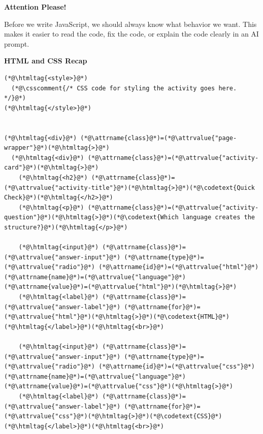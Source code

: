 \documentclass{article}
\begin{document}
\begin{attentionbox}
  \textbf{\Bitter\textcolor{naranja}{Attention Please!}}

  Before we write JavaScript, we should always know what behavior we want.
  This makes it easier to read the code, fix the code, or explain the code clearly in an AI prompt.
\end{attentionbox}


\vspace{0.3cm}

\vspace{0.3cm}

\noindent
\begin{minipage}[t]{0.48\textwidth}
  \textbf{\Bitter\textcolor{naranja}{HTML and CSS Recap}}

  \vspace{0.15cm}

  \begin{lstlisting}
(*@\htmltag{<style>}@*)
  (*@\csscomment{/* CSS code for styling the activity goes here. */}@*)
(*@\htmltag{</style>}@*)


(*@\htmltag{<div}@*) (*@\attrname{class}@*)=(*@\attrvalue{"page-wrapper"}@*)(*@\htmltag{>}@*)
  (*@\htmltag{<div}@*) (*@\attrname{class}@*)=(*@\attrvalue{"activity-card"}@*)(*@\htmltag{>}@*)
    (*@\htmltag{<h2}@*) (*@\attrname{class}@*)=(*@\attrvalue{"activity-title"}@*)(*@\htmltag{>}@*)(*@\codetext{Quick Check}@*)(*@\htmltag{</h2>}@*)
    (*@\htmltag{<p}@*) (*@\attrname{class}@*)=(*@\attrvalue{"activity-question"}@*)(*@\htmltag{>}@*)(*@\codetext{Which language creates the structure?}@*)(*@\htmltag{</p>}@*)

    (*@\htmltag{<input}@*) (*@\attrname{class}@*)=(*@\attrvalue{"answer-input"}@*) (*@\attrname{type}@*)=(*@\attrvalue{"radio"}@*) (*@\attrname{id}@*)=(*@\attrvalue{"html"}@*) (*@\attrname{name}@*)=(*@\attrvalue{"language"}@*) (*@\attrname{value}@*)=(*@\attrvalue{"html"}@*)(*@\htmltag{>}@*)
    (*@\htmltag{<label}@*) (*@\attrname{class}@*)=(*@\attrvalue{"answer-label"}@*) (*@\attrname{for}@*)=(*@\attrvalue{"html"}@*)(*@\htmltag{>}@*)(*@\codetext{HTML}@*)(*@\htmltag{</label>}@*)(*@\htmltag{<br>}@*)

    (*@\htmltag{<input}@*) (*@\attrname{class}@*)=(*@\attrvalue{"answer-input"}@*) (*@\attrname{type}@*)=(*@\attrvalue{"radio"}@*) (*@\attrname{id}@*)=(*@\attrvalue{"css"}@*) (*@\attrname{name}@*)=(*@\attrvalue{"language"}@*) (*@\attrname{value}@*)=(*@\attrvalue{"css"}@*)(*@\htmltag{>}@*)
    (*@\htmltag{<label}@*) (*@\attrname{class}@*)=(*@\attrvalue{"answer-label"}@*) (*@\attrname{for}@*)=(*@\attrvalue{"css"}@*)(*@\htmltag{>}@*)(*@\codetext{CSS}@*)(*@\htmltag{</label>}@*)(*@\htmltag{<br>}@*)


\end{lstlisting}
\end{minipage}
\end{document}
